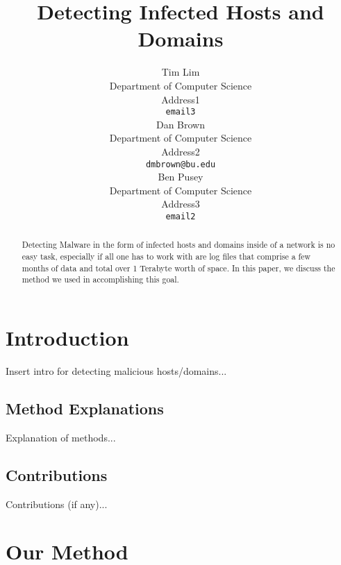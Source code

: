 \documentclass{article} %
\title{Detecting Infected Hosts and Domains}
\author{
Tim  Lim\\
Department of Computer Science \\
Address1 \\
\texttt{email3} \\
\AND
Dan Brown \\
Department of Computer Science \\
Address2 \\
\texttt{dmbrown@bu.edu} \\
\AND
Ben Pusey \\
Department of Computer Science \\
Address3 \\
\texttt{email2} \\
}
\begin{document}
\maketitle

\begin{abstract}
Detecting Malware in the form of infected hosts and domains inside of a network 
is no easy task, especially if all one has to work with are log files that comprise 
a few months of data and total over 1 Terabyte worth of space. In this paper, we discuss
the method we used in accomplishing this goal.
\end{abstract}

\section{Introduction}
Insert intro for detecting malicious hosts/domains...

\subsection{Method Explanations}
Explanation of methods...

\subsection{Contributions}
Contributions (if any)...
 





\section{Our Method}
\label{method}
\end{document}
